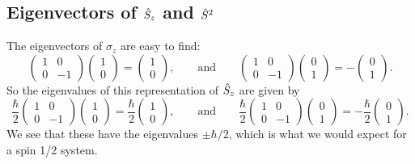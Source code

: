 \subsection{Eigenvectors of \texorpdfstring{\(\hat{S}_z\)}{Sz} and \texorpdfstring{\(\hat{S}^2\)}{S2}}
The eigenvectors of \(\sigma_z\) are easy to find:
\[
\begin{pmatrix}
    1 & 0\\
    0 & -1
\end{pmatrix}
\begin{pmatrix}
    1\\ 0
\end{pmatrix}
=
\begin{pmatrix}
    1\\ 0
\end{pmatrix}
,\qquad\text{and}\qquad
\begin{pmatrix}
    1 & 0\\
    0 & -1
\end{pmatrix}
\begin{pmatrix}
    0\\ 1
\end{pmatrix}
= -
\begin{pmatrix}
    0\\ 1
\end{pmatrix}
.
\]
So the eigenvalues of this representation of \(\hat{S}_z\) are given by
\[
\frac{\hbar}{2}
\begin{pmatrix}
    1 & 0\\
    0 & -1
\end{pmatrix}
\begin{pmatrix}
    1\\ 0
\end{pmatrix}
= \frac{\hbar}{2}
\begin{pmatrix}
    1\\ 0
\end{pmatrix}
,\qquad\text{and}\qquad
\frac{\hbar}{2}
\begin{pmatrix}
    1 & 0\\
    0 & -1
\end{pmatrix}
\begin{pmatrix}
    0\\ 1
\end{pmatrix}
= -\frac{\hbar}{2}
\begin{pmatrix}
    0\\ 1
\end{pmatrix}
.
\]
We see that these have the eigenvalues \(\pm\hbar/2\), which is what we would expect for a spin 1/2 system.
